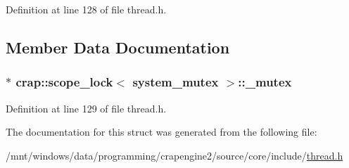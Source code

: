 Definition at line 128 of file thread.\+h.



\subsection{Member Data Documentation}
\hypertarget{structcrap_1_1scope__lock_3_01system__mutex_01_4_a3b2b0e888958844a834b7bde108c4b10}{
\subsubsection[{\+\_\+mutex}]{$\ast$ {\bf crap\+::scope\+\_\+lock}$<$ {\bf system\+\_\+mutex} $>$\+::\+\_\+mutex}}\label{structcrap_1_1scope__lock_3_01system__mutex_01_4_a3b2b0e888958844a834b7bde108c4b10}


Definition at line 129 of file thread.\+h.



The documentation for this struct was generated from the following file\+:\begin{DoxyCompactItemize}
\item 
/mnt/windows/data/programming/crapengine2/source/core/include/\hyperlink{thread_8h}{thread.\+h}\end{DoxyCompactItemize}
